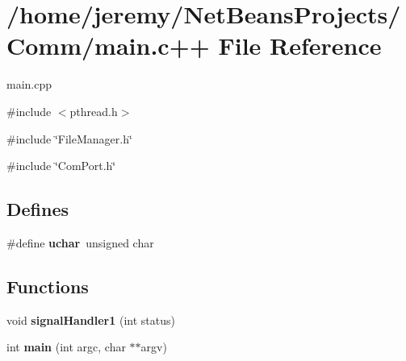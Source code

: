 \hypertarget{main_8c_09_09}{
\section{/home/jeremy/NetBeansProjects/Comm/main.c++ File Reference}
\label{main_8c_09_09}
}


main.cpp  


{\ttfamily \#include $<$pthread.h$>$}\par
{\ttfamily \#include \char`\"{}FileManager.h\char`\"{}}\par
{\ttfamily \#include \char`\"{}ComPort.h\char`\"{}}\par
\subsection*{Defines}
\begin{DoxyCompactItemize}
\item 
\hypertarget{main_8c_09_09_aa8ddf20cdd716b652e76e23e5e700893}{
\#define {\bfseries uchar}~unsigned char}
\label{main_8c_09_09_aa8ddf20cdd716b652e76e23e5e700893}

\end{DoxyCompactItemize}
\subsection*{Functions}
\begin{DoxyCompactItemize}
\item 
\hypertarget{main_8c_09_09_a25638689fdf13290a7da74f4359ce3af}{
void {\bfseries signalHandler1} (int status)}
\label{main_8c_09_09_a25638689fdf13290a7da74f4359ce3af}

\item 
\hypertarget{main_8c_09_09_a3c04138a5bfe5d72780bb7e82a18e627}{
int {\bfseries main} (int argc, char $\ast$$\ast$argv)}
\label{main_8c_09_09_a3c04138a5bfe5d72780bb7e82a18e627}

\end{DoxyCompactItemize}
